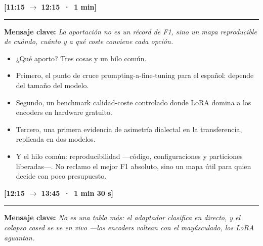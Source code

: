 \documentclass[11pt,a4paper]{article}
\newcommand{\bloque}[2]{\medskip\noindent{\large\textbf{\textcolor{blue!45!black}{#1}}}\hfill{\small\textbf{[#2]}}\par
  \nopagebreak\rule{\linewidth}{0.4pt}\par\nopagebreak\smallskip}
\newcommand{\clave}[1]{\noindent\textbf{Mensaje clave:} \emph{#1}\par\smallskip}
\newcommand{\visual}[1]{\noindent{\footnotesize\textcolor{teal!60!black}{$\square$~[apoyo visual]: #1}}\par\smallskip}
\newenvironment{decir}{\begin{itemize}[label=\textbf{--},leftmargin=1.3em,itemsep=2.5pt,topsep=3pt]}{\end{itemize}}
\begin{document}
\bloque{5. Contribución}{11:15 $\rightarrow$ 12:15 \,·\, 1 min}
\clave{La aportación no es un récord de F1, sino un mapa reproducible de cuándo, cuánto y a qué coste conviene cada opción.}
\visual{Tres contribuciones, una línea cada una; abajo, la palabra ``reproducible''.}
\begin{decir}
  \item ¿Qué aporto? Tres cosas y un hilo común.
  \item Primero, el punto de cruce prompting-a-fine-tuning para el español: depende del tamaño del modelo.
  \item Segundo, un benchmark calidad-coste controlado donde LoRA domina a los encoders en hardware gratuito.
  \item Tercero, una primera evidencia de asimetría dialectal en la transferencia, replicada en dos modelos.
  \item Y el hilo común: reproducibilidad ---código, configuraciones y particiones liberadas---. No reclamo el mejor F1 absoluto, sino un mapa útil para quien decide con poco presupuesto.
\end{decir}

\bloque{6. Cierre en vivo --- demo}{12:15 $\rightarrow$ 13:45 \,·\, 1 min 30 s}
\clave{No es una tabla más: el adaptador clasifica en directo, y el colapso cased se ve en vivo ---los encoders voltean con el mayúsculado, los LoRA aguantan.}
\visual{Demo en vivo servida desde la DGX (H200) por túnel SSH: los 5 modelos a la vez. Slide de respaldo con el antes/después estático por si falla (Plan~B).}

\par\smallskip
\end{document}
